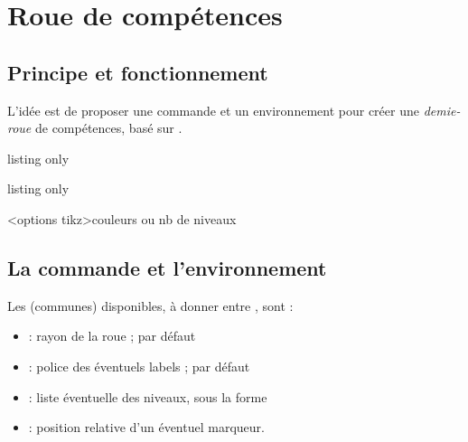 \documentclass[french,11pt,a4paper]{article}
\begin{document}
\pagebreak

\section{Roue de compétences}

\subsection{Principe et fonctionnement}

L'idée est de proposer une commande et un environnement pour créer une \textit{demie-roue} de compétences, basé sur .

\begin{DemoCode}{listing only}
%
\end{DemoCode}

\begin{DemoCode}{listing only}
\begin{EnvRoueNiveaux}[clés]<options tikz>{couleurs ou nb de niveaux}%
\end{EnvRoueNiveaux}
\end{DemoCode}

\begin{DemoCode}{}
\hspace{5mm}
\end{DemoCode}

\begin{DemoCode}{}
\begin{EnvRoueNiveaux}{4}
	\PlacerIconesNiveaux{\faPython,\faAdjust,\faAngellist,\faAmbulance}
\end{EnvRoueNiveaux}
\end{DemoCode}

\subsection{La commande et l'environnement}

Les  (communes) disponibles, à donner entre \MontreCode{[...]}, sont :

\begin{itemize}
	\item {} : rayon de la roue ; \MontreCode{4cm} par défaut
	\item {} : police des éventuels labels ;  par défaut
	\item {} : liste éventuelle des niveaux, sous la forme 
	\item {} : position relative d'un éventuel marqueur.
\end{itemize}
\end{document}
